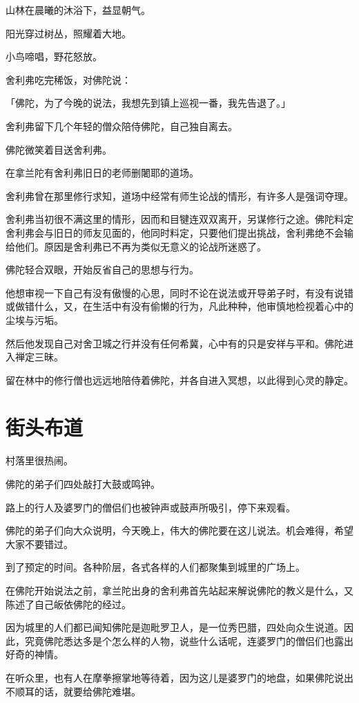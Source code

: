 \documentclass[twoside,openany]{book}
\begin{document}
山林在晨曦的沐浴下，益显朝气。

阳光穿过树丛，照耀着大地。

小鸟啼唱，野花怒放。

舍利弗吃完稀饭，对佛陀说：

「佛陀，为了今晚的说法，我想先到镇上巡视一番，我先告退了。」

舍利弗留下几个年轻的僧众陪侍佛陀，自己独自离去。

佛陀微笑着目送舍利弗。

在拿兰陀有舍利弗旧日的老师删闍耶的道场。

舍利弗曾在那里修行求知，道场中经常有师生论战的情形，有许多人是强词夺理。

舍利弗当初很不满这里的情形，因而和目犍连双双离开，另谋修行之途。佛陀料定舍利弗会与旧日的师友见面的，他同时料定，只要他们提出挑战，舍利弗绝不会输给他们。原因是舍利弗已不再为类似无意义的论战所迷惑了。

佛陀轻合双眼，开始反省自己的思想与行为。

他想审视一下自己有没有傲慢的心思，同时不论在说法或开导弟子时，有没有说错或做错什么，又，在生活中有没有偷懒的行为，凡此种种，他审慎地检视着心中的尘埃与污垢。

然后他发现自己对舍卫城之行并没有任何希冀，心中有的只是安祥与平和。佛陀进入禅定三昧。

留在林中的修行僧也远远地陪侍着佛陀，并各自进入冥想，以此得到心灵的静定。

\section{街头布道}\label{sec6.5}

村落里很热闹。

佛陀的弟子们四处敲打大鼓或鸣钟。

路上的行人及婆罗门的僧侣们也被钟声或鼓声所吸引，停下来观看。

佛陀的弟子们向大众说明，今天晚上，伟大的佛陀要在这儿说法。机会难得，希望大家不要错过。

到了预定的时间。各种阶层，各式各样的人们都聚集到城里的广场上。

在佛陀开始说法之前，拿兰陀出身的舍利弗首先站起来解说佛陀的教义是什么，又陈述了自己皈依佛陀的经过。

因为城里的人们都已闻知佛陀是迦毗罗卫人，是一位秀巴腊，四处向众生说道。因此，究竟佛陀悉达多是个怎么样的人物，说些什么话呢，连婆罗门的僧侣们也露出好奇的神情。

在听众里，也有人在摩拳擦掌地等待着，因为这儿是婆罗门的地盘，如果佛陀说出不顺耳的话，就要给佛陀难堪。
\end{document}
